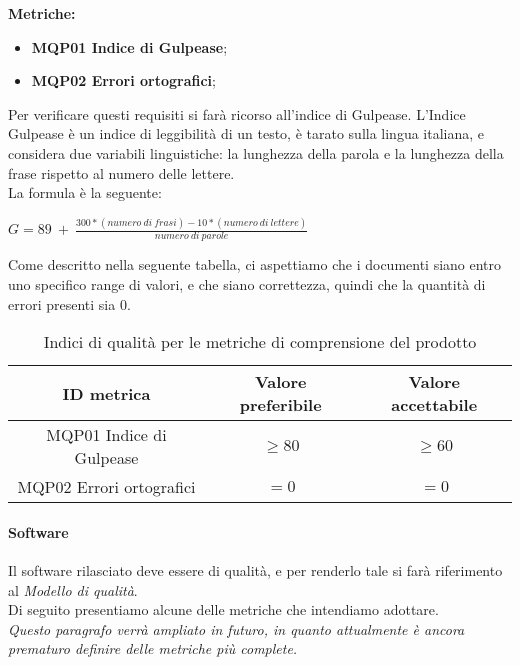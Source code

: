 \documentclass[../piano_di_qualifica.tex]{subfiles}
\begin{document}
\textbf{Metriche:}
\smallbreak
\begin{itemize}
	\item \textbf{MQP01 Indice di Gulpease};
	\item \textbf{MQP02 Errori ortografici};
\end{itemize}

Per verificare questi requisiti si farà ricorso all’indice di Gulpease. L'Indice Gulpease è un indice di leggibilità di un testo, è tarato sulla lingua italiana, e considera due variabili linguistiche: la lunghezza della parola e la lunghezza della frase rispetto al numero delle lettere.\\
La formula è la seguente:\par
\begin{center}
	$G = 89\ +\ \frac{300 * (numero\ di\ frasi) - 10 * (numero\ di\ lettere)}{numero\ di\ parole} $
\end{center}
Come descritto nella seguente tabella, ci aspettiamo che i documenti siano entro uno specifico range di valori, e che siano correttezza, quindi che la quantità di errori presenti sia 0. \par

\begin{table}[!ht]
	\centering
	\begin{tabular}{|c|c|c|}
		\hline
		\rowcolor{lightgray}
		\textbf{ID metrica}      & \textbf{Valore preferibile} & \textbf{Valore accettabile} \\
		\hline
		MQP01 Indice di Gulpease & \(\ge 80\)                  & \(\ge 60\)                  \\
		\hline
		MQP02 Errori ortografici & \(= 0\)                     & \(= 0\)                     \\
		\hline
	\end{tabular}
	\caption{Indici di qualità per le metriche di comprensione del prodotto}
\end{table}

\paragraph{Software}
Il software rilasciato deve essere di qualità, e per renderlo tale si farà riferimento al \emph{Modello di qualità}. \\
Di seguito presentiamo alcune delle metriche che intendiamo adottare. \\
\emph{Questo paragrafo verrà ampliato in futuro, in quanto attualmente è ancora prematuro definire delle metriche più complete.} \\
\end{document}
